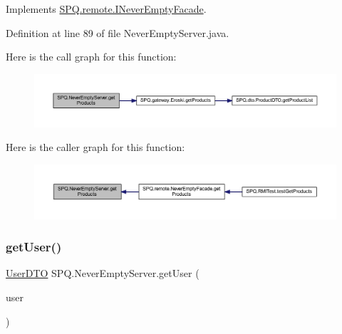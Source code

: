 Implements \mbox{\hyperlink{interface_s_p_q_1_1remote_1_1_i_never_empty_facade_a62d4a1747b8ba90f451fc9f9343055f3}{S\+P\+Q.\+remote.\+I\+Never\+Empty\+Facade}}.



Definition at line 89 of file Never\+Empty\+Server.\+java.

Here is the call graph for this function\+:
\nopagebreak
\begin{figure}[H]
\begin{center}
\leavevmode
\includegraphics[width=350pt]{class_s_p_q_1_1_never_empty_server_ad8c5a0afa259c6b8bcc2eb2444742ca2_cgraph}
\end{center}
\end{figure}
Here is the caller graph for this function\+:
\nopagebreak
\begin{figure}[H]
\begin{center}
\leavevmode
\includegraphics[width=350pt]{class_s_p_q_1_1_never_empty_server_ad8c5a0afa259c6b8bcc2eb2444742ca2_icgraph}
\end{center}
\end{figure}
\mbox{\label{class_s_p_q_1_1_never_empty_server_abb18bd0d72ecb8790068f206c592c58d}} 
\subsubsection{\texorpdfstring{get\+User()}{getUser()}}
{\footnotesize\ttfamily \mbox{\hyperlink{class_s_p_q_1_1dto_1_1_user_d_t_o}{User\+D\+TO}} S\+P\+Q.\+Never\+Empty\+Server.\+get\+User (\begin{DoxyParamCaption}\item[{\mbox{\hyperlink{class_s_p_q_1_1dto_1_1_user_d_t_o}{User\+D\+TO}}}]{user }\end{DoxyParamCaption})}



